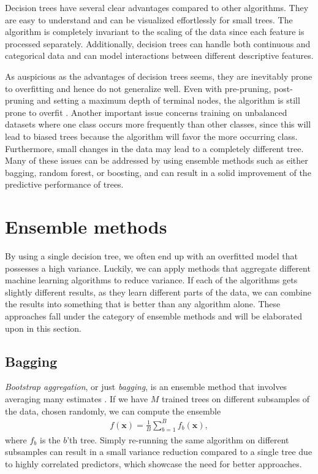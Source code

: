 Decision trees have several clear advantages compared to other algorithms. They are easy to understand and can be visualized effortlessly for small trees. The algorithm is completely invariant to the scaling of the data since each feature is processed separately. Additionally, decision trees can handle both continuous and categorical data and can model interactions between different descriptive features.

As auspicious as the advantages of decision trees seems, they are inevitably prone to overfitting and hence do not generalize well. Even with pre-pruning, post-pruning and setting a maximum depth of terminal nodes, the algorithm is still prone to overfit \cite{Guido2016}. Another important issue concerns training on unbalanced datasets where one class occurs more frequently than other classes, since this will lead to biased trees because the algorithm will favor the more occurring class. Furthermore, small changes in the data may lead to a completely different tree. Many of these issues can be addressed by using ensemble methods such as either bagging, random forest, or boosting, and can result in a solid improvement of the predictive performance of trees.

\section{Ensemble methods}

By using a single decision tree, we often end up with an overfitted model that possesses a high variance. Luckily, we can apply methods that aggregate different machine learning algorithms to reduce variance. If each of the algorithms gets slightly different results, as they learn different parts of the data, we can combine the results into something that is better than any algorithm alone. These approaches fall under the category of ensemble methods and will be elaborated upon in this section. %

\subsection{Bagging}

\textit{Bootstrap aggregation}, or just \textit{bagging}, is an ensemble method that involves averaging many estimates \cite{Murphy2012}. If we have $M$ trained trees on different subsamples of the data, chosen randomly, we can compute the ensemble
\begin{align}
  f(\boldsymbol{x}) = \frac{1}{B} \sum_{b=1}^B f_b(\boldsymbol{x}),
\end{align}
where $f_b$ is the $b$'th tree. Simply re-running the same algorithm on different subsamples can result in a small variance reduction compared to a single tree due to highly correlated predictors, which showcase the need for better approaches.

